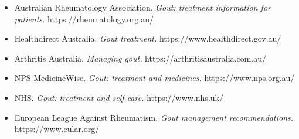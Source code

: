 \begin{itemize}
    \item Australian Rheumatology Association. \textit{Gout: treatment information for patients.} https://rheumatology.org.au/
    \item Healthdirect Australia. \textit{Gout treatment.} https://www.healthdirect.gov.au/
    \item Arthritis Australia. \textit{Managing gout.} https://arthritisaustralia.com.au/
    \item NPS MedicineWise. \textit{Gout: treatment and medicines.} https://www.nps.org.au/
    \item NHS. \textit{Gout: treatment and self-care.} https://www.nhs.uk/
    \item European League Against Rheumatism. \textit{Gout management recommendations.} https://www.eular.org/
\end{itemize}
